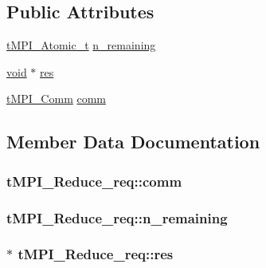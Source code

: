 \subsection*{\-Public \-Attributes}
\begin{DoxyCompactItemize}
\item 
\hyperlink{include_2thread__mpi_2atomic_2gcc_8h_a2c33794dc540e3b07cffc1f81a3fe4b4}{t\-M\-P\-I\-\_\-\-Atomic\-\_\-t} \hyperlink{structtMPI__Reduce__req_adafc68266df797f23ea8615f04440cde}{n\-\_\-remaining}
\item 
\hyperlink{nbnxn__kernel__simd__4xn__outer_8h_a8dc3f4a797ed992dff49d2fa3477eee8}{void} $\ast$ \hyperlink{structtMPI__Reduce__req_a8fab2e57112b3617dbcc2815b82b7852}{res}
\item 
\hyperlink{include_2thread__mpi_2tmpi_8h_ab76dc275b882a1d00a54353fb8dd4cb3}{t\-M\-P\-I\-\_\-\-Comm} \hyperlink{structtMPI__Reduce__req_afa4692dc8f18be5dc241ebcd6679b9d9}{comm}
\end{DoxyCompactItemize}


\subsection{\-Member \-Data \-Documentation}
\hypertarget{structtMPI__Reduce__req_afa4692dc8f18be5dc241ebcd6679b9d9}{
\subsubsection[{comm}]{ {\bf t\-M\-P\-I\-\_\-\-Reduce\-\_\-req\-::comm}}}\label{structtMPI__Reduce__req_afa4692dc8f18be5dc241ebcd6679b9d9}
\hypertarget{structtMPI__Reduce__req_adafc68266df797f23ea8615f04440cde}{
\subsubsection[{n\-\_\-remaining}]{ {\bf t\-M\-P\-I\-\_\-\-Reduce\-\_\-req\-::n\-\_\-remaining}}}\label{structtMPI__Reduce__req_adafc68266df797f23ea8615f04440cde}
\hypertarget{structtMPI__Reduce__req_a8fab2e57112b3617dbcc2815b82b7852}{
\subsubsection[{res}]{ $\ast$ {\bf t\-M\-P\-I\-\_\-\-Reduce\-\_\-req\-::res}}}\label{structtMPI__Reduce__req_a8fab2e57112b3617dbcc2815b82b7852}



